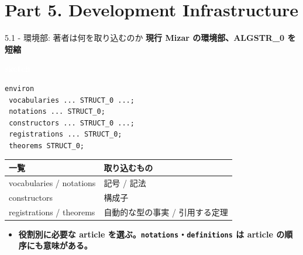 \documentclass[dvipdfmx,aspectratio=169,11pt]{beamer}
\newcommand{\statusbadge}[2]{\colorbox{#1}{\textcolor{white}{\strut\scriptsize\sffamily\bfseries #2}}}
\newcommand{\badgeSketch}{\statusbadge{orange!75!black}{sketch}}
\begin{document}
\section{Part 5. Development Infrastructure}
\begin{frame}[fragile,t]{5.1 - 環境部: 著者は何を取り込むのか}
\smallskip
\textbf{現行 Mizar の環境部、ALGSTR\_0 を短縮}~\badgeSketch
\begin{lstlisting}[language={mizar},basicstyle=\ttfamily\small]
environ
 vocabularies ... STRUCT_0 ...;
 notations ... STRUCT_0;
 constructors ... STRUCT_0 ...;
 registrations ... STRUCT_0;
 theorems STRUCT_0;
\end{lstlisting}
\begin{footnotesize}
\setlength{\tabcolsep}{3pt}
\renewcommand{\arraystretch}{1.15}
\begin{tabularx}{\textwidth}{>{\raggedright\arraybackslash}X>{\raggedright\arraybackslash}X}
\toprule
\textbf{一覧} & \textbf{取り込むもの} \\
\midrule
vocabularies / notations & 記号 / 記法 \\
constructors & 構成子 \\
registrations / theorems & 自動的な型の事実 / 引用する定理 \\
\bottomrule
\end{tabularx}
\end{footnotesize}

\begin{itemize}
\setlength{\itemsep}{1pt}
\setlength{\parsep}{0pt}
\setlength{\parskip}{0pt}
\item \textcolor{blue!55!black}{\textbf{役割別に必要な article を選ぶ。\texttt{notations}・\texttt{definitions} は article の順序にも意味がある。}}
\end{itemize}
\end{frame}
\end{document}
